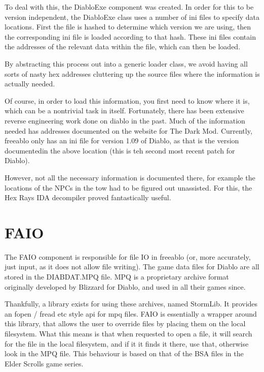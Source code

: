 	To deal with this, the DiabloExe component was created. In order for this to be version independent, the DiabloExe class uses a number of ini files to specify data locations. First the file is hashed to determine which version we are using, then the corresponding ini file is loaded according to that hash. These ini files contain the addresses of the relevant data within the file, which can then be loaded.
	
	By abstracting this process out into a generic loader class, we avoid having all sorts of nasty hex addresses cluttering up the source files where the information is actually needed.
	
	Of course, in order to load this information, you first need to know where it is, which can be a nontrivial task in itself. Fortunately, there has been extensive reverse engineering work done on diablo in the past. Much of the information needed has addresses documented on the website for The Dark Mod\cite{dmodhex}. Currently, freeablo only has an ini file for version 1.09 of Diablo, as that is the version documentedin the above location (this is teh second most recent patch for Diablo).
	
	However, not all the necessary information is documented there, for example the locations of the NPCs in the tow had to be figured out unassisted. For this, the Hex Rays IDA\cite{hexrays} decompiler proved fantastically useful.

\section{FAIO}
	The FAIO component is responsible for file IO in freeablo (or, more accurately, just input, as it does not allow file writing).
	The game data files for Diablo are all stored in the DIABDAT.MPQ file. MPQ is a proprietary archive format originally developed by Blizzard for Diablo, and used in all their games since.
	
	Thankfully, a library exists for using these archives, named StormLib\cite{stormlib}. It provides an fopen / fread etc style api for mpq files.
	FAIO is essentially a wrapper around this library, that allows the user to override files by placing them on the local filesystem. What this means is that when requested to open a file, it will search for the file in the local filesystem, and if it it finds it there, use that, otherwise look in the MPQ file.
	This behaviour is based on that of the BSA files in the Elder Scrolls game series.
	
